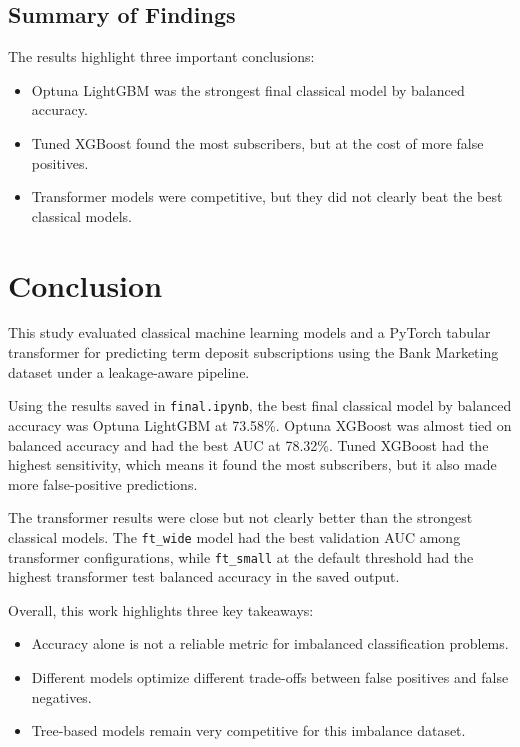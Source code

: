 \documentclass[10pt,twocolumn]{article}
\begin{document}
\subsection{Summary of Findings}

The results highlight three important conclusions:

\begin{itemize}
  \item Optuna LightGBM was the strongest final classical model by balanced accuracy.
  \item Tuned XGBoost found the most subscribers, but at the cost of more false positives.
  \item Transformer models were competitive, but they did not clearly beat the best classical models.
\end{itemize}
\section{Conclusion}

This study evaluated classical machine learning models and a PyTorch tabular transformer for predicting term deposit subscriptions using the Bank Marketing dataset under a leakage-aware pipeline.

Using the results saved in \texttt{final.ipynb}, the best final classical model by balanced accuracy was Optuna LightGBM at 73.58\%. Optuna XGBoost was almost tied on balanced accuracy and had the best AUC at 78.32\%. Tuned XGBoost had the highest sensitivity, which means it found the most subscribers, but it also made more false-positive predictions.

The transformer results were close but not clearly better than the strongest classical models. The \texttt{ft\_wide} model had the best validation AUC among transformer configurations, while \texttt{ft\_small} at the default threshold had the highest transformer test balanced accuracy in the saved output.

Overall, this work highlights three key takeaways:
\begin{itemize}
  \item Accuracy alone is not a reliable metric for imbalanced classification problems.
  \item Different models optimize different trade-offs between false positives and false negatives.
  \item Tree-based models remain very competitive for this imbalance dataset.
\end{itemize}
\end{document}
